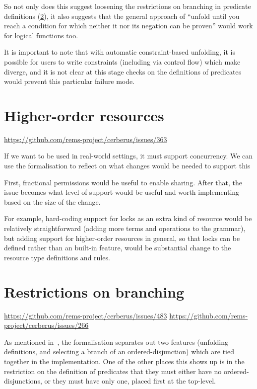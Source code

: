 So not only does this suggest loosening the restrictions on branching in
predicate definitions (\cref{sec:restriction-branching}), it also suggests that
the general approach of ``unfold until you reach a condition for which neither
it nor its negation can be proven'' would work for logical functions too.

It is important to note that with automatic constraint-based unfolding, it is
possible for users to write constraints (including via control flow) which make
 diverge, and it is not clear at this stage checks on the definitions
of predicates would prevent this particular failure
mode.

\section{Higher-order resources}
\url{https://github.com/rems-project/cerberus/issues/363}

If we want  to be used in real-world settings, it must support
concurrency. We can use the formalisation to reflect on what changes
would be needed to support this

First, fractional permissions would be useful to enable sharing. After that,
the issue becomes what level of support would be useful and worth implementing
based on the size of the change.

For example, hard-coding support for locks as an extra kind of resource would
be relatively straightforward (adding more terms and operations to the
grammar), but adding support for higher-order resources in general, so that
locks can be defined rather than an built-in feature, would be substantial
change to the resource type definitions and rules.

\section{Restrictions on branching}\label{sec:restriction-branching}
\url{https://github.com/rems-project/cerberus/issues/483}
\url{https://github.com/rems-project/cerberus/issues/266}

As mentioned in~, the formalisation
separates out two features (unfolding definitions, and selecting a branch of an
ordered-disjunction) which are tied together in the implementation. One of
the other places this shows up is in the restriction on the definition of
predicates that they must either have no ordered-disjunctions, or they
must have only one, placed first at the top-level.

